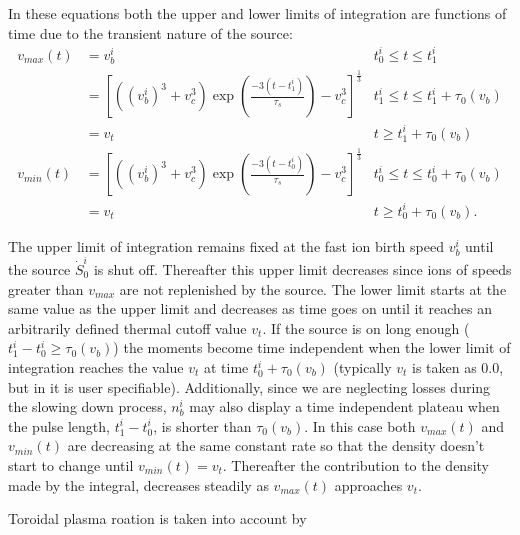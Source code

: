 In these equations  both the upper and lower limits of integration are functions
of time due to the transient nature of the source:
\begin{align}
 v_{max}(t) & = v_b^i &  t_0^i\le t \le t_1^i \\
 & = [((v_b^i)^3
 +v_c^3)\exp(\frac{-3(t-t_1^i)}{\tau_s})
 -v_c^3]^{\frac{1}{3}} &t_1^i \le t \le
 t_1^i+\tau_0(v_b) \\
 & = v_t & t \ge t_1^i+\tau_0(v_b) \\
 v_{min}(t) & =  [((v_b^i)^3
 +v_c^3)\exp(\frac{-3(t-t_0^i)}{\tau_s})
 -v_c^3]^{\frac{1}{3}}  &t_0^i \le t \le
 t_0^i+\tau_0(v_b) \\
 & = v_t & t \ge t_0^i+\tau_0(v_b).
\end{align}

The upper limit of integration remains fixed at the fast ion birth speed $v_b^i$
until the source $ \dot S_0^i $ is shut off.  Thereafter this upper limit
decreases  since ions of speeds greater than $ v_{max} $ are not replenished by
the source.  The lower limit starts at the same value as the upper limit and
decreases as time goes on until it reaches an arbitrarily defined thermal cutoff
value $ v_t $. If the source is on long enough ($ t_1^i-t_0^i \ge \tau_0(v_b)$) 
the moments  become time independent when the lower limit of  integration 
reaches the value $ v_t $ at time $t_0^i +\tau_0(v_b)$ (typically $v_t$ is taken
as 0.0, but in \ot it is user specifiable). Additionally, since we are
neglecting losses during the slowing down process, $n_b^i $ may also display a 
time independent plateau when the pulse length, $ t_1^i -t_0^i $, is shorter
than $ \tau_0(v_b)$. In this case both $v_{max}(t) $ and $v_{min}(t) $ are
decreasing at the same constant rate so that the density doesn't start to change
until $v_{min}(t) = v_t $. Thereafter the contribution to the density made by
the integral,   decreases steadily as $v_{max}(t) $ approaches
$v_t$.

Toroidal plasma roation is taken into account by 


